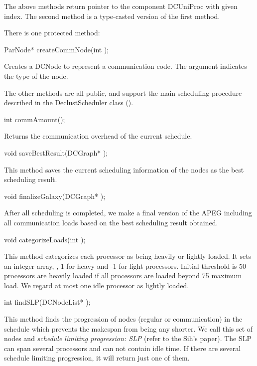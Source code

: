 The above methods return pointer to the component DCUniProc with given index.
The second method is a type-casted version of the first method.

There is one protected method:

\begin{example}
ParNode* createCommNode(int );
\end{example}

Creates a DCNode to represent a communication code. The argument indicates
the type of the node.

The other methods are all public, and support the main scheduling procedure
described in the DeclustScheduler class ().

\begin{example}
int commAmount();
\end{example}

Returns the communication overhead of the current schedule.

\begin{example}
void saveBestResult(DCGraph* );
\end{example}

This method saves the current scheduling information of the nodes as the best
scheduling result.

\begin{example}
void finalizeGalaxy(DCGraph* );
\end{example}

After all scheduling is completed, we make a final version of the APEG
including all communication loads based on the best scheduling result
obtained.

\begin{example}
void categorizeLoads(int );
\end{example}

This method categorizes each processor as being heavily or lightly loaded.
It sets an integer array, , 1 for heavy and -1 for light
processors. Initial threshold is 50%
processors are heavily loaded if all processors are loaded beyond 75%
maximum load. We regard at most one idle processor as lightly loaded. 

\begin{example}
int findSLP(DCNodeList* );
\end{example}

This method finds the progression of nodes (regular or communication)
in the schedule which prevents the makespan from being any shorter. We call
this set of nodes and \emph{schedule limiting progression: SLP} (refer to
the Sih's paper). The SLP can span several processors and can not contain
idle time. If there are several schedule limiting progression, it will
return just one of them.

